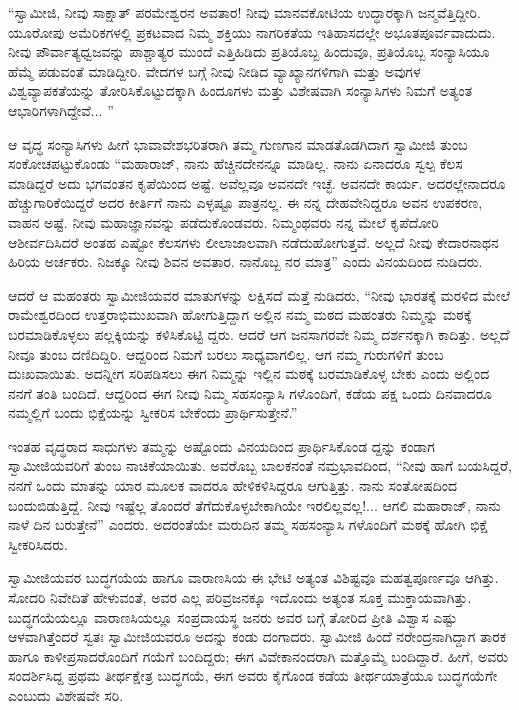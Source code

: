 “ಸ್ವಾಮೀಜಿ, ನೀವು ಸಾಕ್ಷಾತ್ ಪರಮೇಶ್ವರನ ಅವತಾರ! ನೀವು ಮಾನವಕೋಟಿಯ ಉದ್ಧಾರಕ್ಕಾಗಿ ಜನ್ಮವೆತ್ತಿದ್ದೀರಿ. ಯೂರೋಪು ಅಮೆರಿಕಗಳಲ್ಲಿ ಪ್ರಕಟವಾದ ನಿಮ್ಮ ಶಕ್ತಿಯು ನಾಗರಿಕತೆಯ ಇತಿಹಾಸದಲ್ಲೇ ಅಭೂತಪೂರ್ವವಾದುದು. ನೀವು ಪೌರ್ವಾತ್ಯಧ್ವಜವನ್ನು ಪಾಶ್ಚಾತ್ಯರ ಮುಂದೆ ಎತ್ತಿಹಿಡಿದು ಪ್ರತಿಯೊಬ್ಬ ಹಿಂದುವೂ, ಪ್ರತಿಯೊಬ್ಬ ಸಂನ್ಯಾಸಿಯೂ ಹೆಮ್ಮೆ ಪಡುವಂತೆ ಮಾಡಿದ್ದೀರಿ. ವೇದಗಳ ಬಗ್ಗೆ ನೀವು ನೀಡಿದ ವ್ಯಾಖ್ಯಾನಗಳಿಗಾಗಿ ಮತ್ತು ಅವುಗಳ ವಿಶ್ವವ್ಯಾಪಕತೆಯನ್ನು ತೋರಿಸಿಕೊಟ್ಟುದಕ್ಕಾಗಿ ಹಿಂದೂಗಳು ಮತ್ತು ವಿಶೇಷವಾಗಿ ಸಂನ್ಯಾಸಿಗಳು ನಿಮಗೆ ಅತ್ಯಂತ ಆಭಾರಿಗಳಾಗಿದ್ದೇವೆ... ”

ಆ ವೃದ್ಧ ಸಂನ್ಯಾಸಿಗಳು ಹೀಗೆ ಭಾವಾವೇಶಭರಿತರಾಗಿ ತಮ್ಮ ಗುಣಗಾನ ಮಾಡತೊಡಗಿದಾಗ ಸ್ವಾಮೀಜಿ ತುಂಬ ಸಂಕೋಚಪಟ್ಟುಕೊಂಡು “ಮಹಾರಾಜ್, ನಾನು ಹೆಚ್ಚಿನದೇನನ್ನೂ ಮಾಡಿಲ್ಲ. ನಾನು ಏನಾದರೂ ಸ್ವಲ್ಪ ಕೆಲಸ ಮಾಡಿದ್ದರೆ ಅದು ಭಗವಂತನ ಕೃಪೆಯಿಂದ ಅಷ್ಟೆ. ಅವೆಲ್ಲವೂ ಅವನದೇ ಇಚ್ಛೆ. ಅವನದೇ ಕಾರ್ಯ. ಅದರಲ್ಲೇನಾದರೂ ಹೆಚ್ಚುಗಾರಿಕೆಯಿದ್ದರೆ ಅದರ ಕೀರ್ತಿಗೆ ನಾನು ಎಳ್ಳಷ್ಟೂ ಪಾತ್ರನಲ್ಲ. ಈ ನನ್ನ ದೇಹವೇನಿದ್ದರೂ ಅವನ ಉಪಕರಣ, ವಾಹನ ಅಷ್ಟೆ. ನೀವು ಮಹಾಜ್ಞಾನವನ್ನು ಪಡೆದುಕೊಂಡವರು. ನಿಮ್ಮಂಥವರು ನನ್ನ ಮೇಲೆ ಕೃಪೆದೋರಿ ಆಶೀರ್ವದಿಸಿದರೆ ಅಂತಹ ಎಷ್ಟೋ ಕೆಲಸಗಳು ಲೀಲಾಜಾಲವಾಗಿ ನಡೆದುಹೋಗುತ್ತವೆ. ಅಲ್ಲದೆ ನೀವು ಕೇದಾರನಾಥನ ಹಿರಿಯ ಅರ್ಚಕರು. ನಿಜಕ್ಕೂ ನೀವು ಶಿವನ ಅವತಾರ. ನಾನೊಬ್ಬ ನರ ಮಾತ್ರ” ಎಂದು ವಿನಯದಿಂದ ನುಡಿದರು.

ಆದರೆ ಆ ಮಹಂತರು ಸ್ವಾಮೀಜಿಯವರ ಮಾತುಗಳನ್ನು ಲಕ್ಷಿಸದೆ ಮತ್ತೆ ನುಡಿದರು, “ನೀವು ಭಾರತಕ್ಕೆ ಮರಳಿದ ಮೇಲೆ ರಾಮೇಶ್ವರದಿಂದ ಉತ್ತರಾಭಿಮುಖವಾಗಿ ಹೋಗುತ್ತಿದ್ದಾಗ ಅಲ್ಲಿನ ನಮ್ಮ ಮಠದ ಮಹಂತರು ನಿಮ್ಮನ್ನು ಮಠಕ್ಕೆ ಬರಮಾಡಿಕೊಳ್ಳಲು ಪಲ್ಲಕ್ಕಿಯನ್ನು ಕಳಿಸಿಕೊಟ್ಟಿ ದ್ದರು. ಆದರೆ ಆಗ ಜನಸಾಗರವೇ ನಿಮ್ಮ ದರ್ಶನಕ್ಕಾಗಿ ಕಾದಿತ್ತು. ಅಲ್ಲದೆ ನೀವೂ ತುಂಬ ದಣಿದಿದ್ದಿರಿ. ಆದ್ದರಿಂದ ನಿಮಗೆ ಬರಲು ಸಾಧ್ಯವಾಗಲಿಲ್ಲ. ಆಗ ನಮ್ಮ ಗುರುಗಳಿಗೆ ತುಂಬ ದುಃಖವಾಯಿತು. ಅದನ್ನೀಗ ಸರಿಪಡಿಸಲು ಈಗ ನಿಮ್ಮನ್ನು ಇಲ್ಲಿನ ಮಠಕ್ಕೆ ಬರಮಾಡಿಕೊಳ್ಳ ಬೇಕು ಎಂದು ಅಲ್ಲಿಂದ ನನಗೆ ತಂತಿ ಬಂದಿದೆ. ಆದ್ದರಿಂದ ಈಗ ನೀವು ನಿಮ್ಮ ಸಹಸಂನ್ಯಾಸಿ ಗಳೊಂದಿಗೆ, ಕಡೆಯ ಪಕ್ಷ ಒಂದು ದಿನವಾದರೂ ನಮ್ಮಲ್ಲಿಗೆ ಬಂದು ಭಿಕ್ಷೆಯನ್ನು ಸ್ವೀಕರಿಸ ಬೇಕೆಂದು ಪ್ರಾರ್ಥಿಸುತ್ತೇನೆ.”

ಇಂತಹ ವೃದ್ಧರಾದ ಸಾಧುಗಳು ತಮ್ಮನ್ನು ಅಷ್ಟೊಂದು ವಿನಯದಿಂದ ಪ್ರಾರ್ಥಿಸಿಕೊಂಡ ದ್ದನ್ನು ಕಂಡಾಗ ಸ್ವಾಮೀಜಿಯವರಿಗೆ ತುಂಬ ನಾಚಿಕೆಯಾಯಿತು. ಅವರೊಬ್ಬ ಬಾಲಕನಂತೆ ನಮ್ರಭಾವದಿಂದ, “ನೀವು ಹಾಗೆ ಬಯಸಿದ್ದರೆ, ನನಗೆ ಒಂದು ಮಾತನ್ನು ಯಾರ ಮೂಲಕ ವಾದರೂ ಹೇಳಿಕಳಿಸಿದ್ದರೂ ಆಗುತ್ತಿತ್ತು. ನಾನು ಸಂತೋಷದಿಂದ ಬಂದುಬಿಡುತ್ತಿದ್ದೆ. ನೀವು ಇಷ್ಟೆಲ್ಲ ತೊಂದರೆ ತೆಗೆದುಕೊಳ್ಳಬೇಕಾಗಿಯೇ ಇರಲಿಲ್ಲವಲ್ಲ!... ಆಗಲಿ ಮಹಾರಾಜ್, ನಾನು ನಾಳೆ ದಿನ ಬರುತ್ತೇನೆ” ಎಂದರು. ಅದರಂತೆಯೇ ಮರುದಿನ ತಮ್ಮ ಸಹಸಂನ್ಯಾಸಿ ಗಳೊಂದಿಗೆ ಮಠಕ್ಕೆ ಹೋಗಿ ಭಿಕ್ಷೆ ಸ್ವೀಕರಿಸಿದರು.

ಸ್ವಾಮೀಜಿಯವರ ಬುದ್ಧಗಯೆಯ ಹಾಗೂ ವಾರಾಣಸಿಯ ಈ ಭೇಟಿ ಅತ್ಯಂತ ವಿಶಿಷ್ಟವೂ ಮಹತ್ವಪೂರ್ಣವೂ ಆಗಿತ್ತು. ಸೋದರಿ ನಿವೇದಿತೆ ಹೇಳುವಂತೆ, ಅವರ ಎಲ್ಲ ಪರಿವ್ರಜನಕ್ಕೂ ಇದೊಂದು ಅತ್ಯಂತ ಸೂಕ್ತ ಮುಕ್ತಾಯವಾಗಿತ್ತು. ಬುದ್ಧಗಯೆಯಲ್ಲೂ ವಾರಾಣಸಿಯಲ್ಲೂ ಸಂಪ್ರದಾಯಸ್ಥ ಜನರು ಅವರ ಬಗ್ಗೆ ತೋರಿದ ಪ್ರೀತಿ ವಿಶ್ವಾಸ ಎಷ್ಟು ಆಳವಾಗಿತ್ತೆಂದರೆ ಸ್ವತಃ ಸ್ವಾಮೀಜಿಯವರೂ ಅದನ್ನು ಕಂಡು ದಂಗಾದರು. ಸ್ವಾಮೀಜಿ ಹಿಂದೆ ನರೇಂದ್ರನಾಗಿದ್ದಾಗ ತಾರಕ ಹಾಗೂ ಕಾಳೀಪ್ರಸಾದರೊಂದಿಗೆ ಗಯೆಗೆ ಬಂದಿದ್ದರು; ಈಗ ವಿವೇಕಾನಂದರಾಗಿ ಮತ್ತೊಮ್ಮೆ ಬಂದಿದ್ದಾರೆ. ಹೀಗೆ, ಅವರು ಸಂದರ್ಶಿಸಿದ್ದ ಪ್ರಥಮ ತೀರ್ಥಕ್ಷೇತ್ರ ಬುದ್ಧಗಯೆ, ಈಗ ಅವರು ಕೈಗೊಂಡ ಕಡೆಯ ತೀರ್ಥಯಾತ್ರೆಯೂ ಬುದ್ಧಗಯೆಗೇ ಎಂಬುದು ವಿಶೇಷವೇ ಸರಿ.

